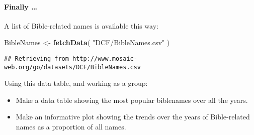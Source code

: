 \documentclass[]{article}
\newenvironment{Shaded}{\begin{snugshade}}{\end{snugshade}}
\newcommand{\KeywordTok}[1]{\textcolor[rgb]{0.13,0.29,0.53}{\textbf{{#1}}}}
\newcommand{\StringTok}[1]{\textcolor[rgb]{0.31,0.60,0.02}{{#1}}}
\newcommand{\NormalTok}[1]{{#1}}
\begin{document}
\paragraph{Finally \ldots{}}\label{finally}

A list of Bible-related names is available this way:

\begin{Shaded}
\begin{Highlighting}[]
\NormalTok{BibleNames <-}\StringTok{ }\KeywordTok{fetchData}\NormalTok{( }\StringTok{"DCF/BibleNames.csv"} \NormalTok{)}
\end{Highlighting}
\end{Shaded}

\begin{verbatim}
## Retrieving from http://www.mosaic-web.org/go/datasets/DCF/BibleNames.csv
\end{verbatim}

Using this data table, and working as a group:

\begin{itemize}
\itemsep1pt\parskip0pt
\item
  Make a data table showing the most popular biblenames over all the
  years.
\item
  Make an informative plot showing the trends over the years of
  Bible-related names as a proportion of all names.
\end{itemize}
\end{document}
